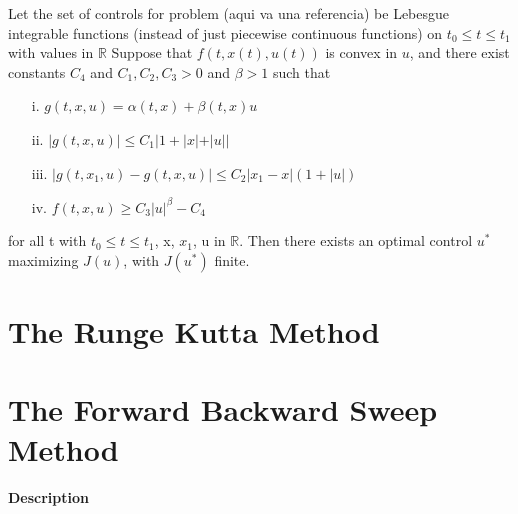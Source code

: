 \begin{theorem}
	Let the set of controls for problem (aqui va una referencia) be Lebesgue
    integrable functions (instead of just piecewise continuous functions) on
    $t_0 \leq t \leq t_1$ with values in $\mathbb{R}$ Suppose that 
    $f(t,x(t),u(t))$ is convex in $u$, and there exist constants $C_4$ and
    $C_1, C_2, C_3 > 0$ and $\beta > 1$ such that
    \begin{enumerate}
    	\item[i.]
        	$g(t,x,u) = \alpha (t,x) + \beta (t,x)u$
        \item[ii.]
        	$|g(t,x,u)| \leq C_1 |1 + |x| + |u||$
        \item[iii.]
        	$|g(t,x_1,u) - g(t,x,u)| \leq C_2 |x_1 - x|(1 + |u|)$
        \item[iv.]
        	$f(t,x,u) \geq C_3 |u|^{\beta} - C_4$
    \end{enumerate}
	for all t with $t_0 \leq t \leq t_1$, x, $x_1$, u in $\mathbb{R}$. Then 
    there exists an optimal control $u^{*}$ maximizing $J(u)$, with $J(u^{*})$
    finite.
\end{theorem}


\section{The Runge Kutta Method}

\section{The Forward Backward Sweep Method}
	\paragraph{Description}



